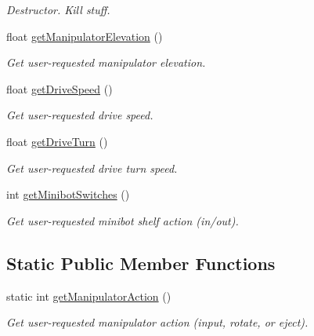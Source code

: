 \begin{DoxyCompactItemize}
\begin{DoxyCompactList}\small\item\em Destructor. Kill stuff. \item\end{DoxyCompactList}\item 
float \hyperlink{class_r_j_f_r_c2011_1_1_controller_afc9c35671f9791605d7c6a55d5c0375b}{getManipulatorElevation} ()
\begin{DoxyCompactList}\small\item\em Get user-\/requested manipulator elevation. \item\end{DoxyCompactList}\item 
float \hyperlink{class_r_j_f_r_c2011_1_1_controller_abee0ec4f9aa51ded688943dab941221e}{getDriveSpeed} ()
\begin{DoxyCompactList}\small\item\em Get user-\/requested drive speed. \item\end{DoxyCompactList}\item 
float \hyperlink{class_r_j_f_r_c2011_1_1_controller_a08f649d3f9e8cd04e4096186949b7920}{getDriveTurn} ()
\begin{DoxyCompactList}\small\item\em Get user-\/requested drive turn speed. \item\end{DoxyCompactList}\item 
int \hyperlink{class_r_j_f_r_c2011_1_1_controller_aac5a08c91980af6d162c0661b5bfde8d}{getMinibotSwitches} ()
\begin{DoxyCompactList}\small\item\em Get user-\/requested minibot shelf action (in/out). \item\end{DoxyCompactList}\end{DoxyCompactItemize}
\subsection*{Static Public Member Functions}
\begin{DoxyCompactItemize}
\item 
static int \hyperlink{class_r_j_f_r_c2011_1_1_controller_a19a25438de68dc0284862e2347bb576c}{getManipulatorAction} ()
\begin{DoxyCompactList}\small\item\em Get user-\/requested manipulator action (input, rotate, or eject). \item\end{DoxyCompactList}\end{DoxyCompactItemize}
